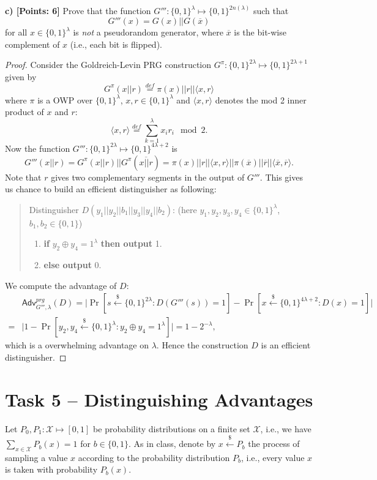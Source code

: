 \documentclass[12pt]{article}
\newcommand{\eqdef}{\stackrel{def}{=}}
\newcommand{\bits}{\{0,1\}}
\newcommand{\getsr}{\stackrel{\$}{\gets}}
\newcommand{\angles}[1]{\langle #1 \rangle}
\newcommand{\Adv}{\textsf{Adv}}
\theoremstyle{definition}
\begin{document}
{\bf c) [Points: 6]} Prove that the function $G''' : \bits^{\lambda} \mapsto \bits^{2n(\lambda)}$ such that
$$G'''(x) = G(x)||G(\overline{x})$$
for all $x\in\bits^\lambda$ is \emph{not} a pseudorandom generator, where $\overline{x}$ is the bit-wise complement of $x$ (i.e., each bit is flipped).
\begin{proof}
Consider the Goldreich-Levin PRG construction $G^\pi : \bits^{2\lambda} \mapsto \bits^{2\lambda+1}$ given by
$$G^\pi(x||r) \eqdef \pi(x)||r||\angles{x,r}$$
where $\pi$ is a OWP over $\bits^\lambda$, $x,r \in \bits^\lambda$ and $\angles{x,r}$ denotes the mod 2 inner product of $x$ and $r$:
$$\angles{x,r} \eqdef \sum_{k=1}^\lambda x_ir_i\mod 2.$$
Now the function $G''' : \bits^{2\lambda} \mapsto \bits^{4\lambda+2}$ is
$$G'''(x||r) = G^\pi(x||r)||G^\pi(\overline{x||r}) = \pi(x)||r||\angles{x,r}||\pi(\overline{x})||\overline{r}||\angles{\overline{x},\overline{r}}.$$
Note that $r$ gives two complementary segments in the output of $G'''$. This gives us chance to build an efficient distinguisher as following:
\begin{quote}
Distinguisher $D(y_1||y_2||b_1||y_3||y_4||b_2)$: (here $y_1,y_2,y_3,y_4 \in \bits^\lambda$, $b_1,b_2\in\bits$)
\begin{enumerate}
\item {\bf if} $y_2 \oplus y_4 = 1^\lambda$ {\bf then output} 1.
\item {\bf else output} 0.
\end{enumerate}
\end{quote}
We compute the advantage of $D$:
$$
\begin{aligned}
&\Adv_{G''',\lambda}^{prg}(D) = \bigg| \Pr[s\getsr \bits^{2\lambda}: D(G'''(s))=1] - \Pr[x\getsr \bits^{4\lambda+2}: D(x)=1] \bigg| \\
=& \bigg| 1 - \Pr[y_2,y_4 \getsr\bits^\lambda: y_2 \oplus y_4 = 1^\lambda] \bigg| = 1 - 2^{-\lambda},
\end{aligned}
$$
which is a overwhelming advantage on $\lambda$. Hence the construction $D$ is an efficient distinguisher.
\end{proof}


\section{Task 5 – Distinguishing Advantages}
Let $P_0, P_1 : \mathcal{X} \mapsto [0,1]$ be probability distributions on a finite set $\mathcal{X}$, i.e., we have $\sum_{x\in\mathcal{X}}P_b(x) = 1$ for $b\in\bits$. As in class, denote by $x\getsr P_b$ the process of sampling a value $x$ according to the probability distribution $P_b$, i.e., every value $x$ is taken with probability $P_b(x)$.
\end{document}
